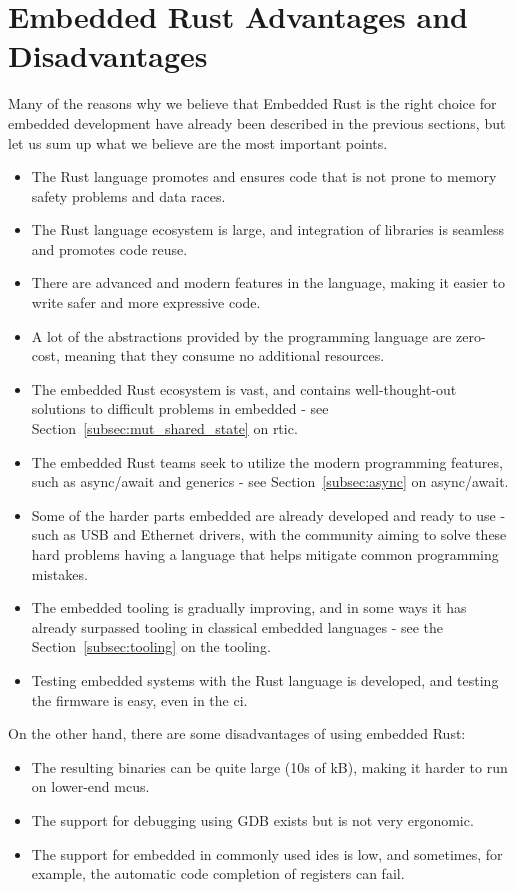 \section{Embedded Rust Advantages and Disadvantages}
\label{sec:embedded_rust_reasoning}
Many of the reasons why we believe that Embedded Rust is the right choice for embedded development have already been described in the previous sections, but let us sum up what we believe are the most important points.
\begin{itemize}
    \item The Rust language promotes and ensures code that is not prone to memory safety problems and data races.
    \item The Rust language ecosystem is large, and integration of libraries is seamless and promotes code reuse.
    \item There are advanced and modern features in the language, making it easier to write safer and more expressive code.
    \item A lot of the abstractions provided by the programming language are zero-cost, meaning that they consume no additional resources.
    \item The embedded Rust ecosystem is vast, and contains well-thought-out solutions to difficult problems in embedded - see Section~\ref{subsec:mut_shared_state} on \acs{rtic}.
    \item The embedded Rust teams seek to utilize the modern programming features, such as async/await and generics - see Section~\ref{subsec:async} on async/await.
    \item Some of the harder parts embedded are already developed and ready to use - such as USB and Ethernet drivers, with the community aiming to solve these hard problems having a language that helps mitigate common programming mistakes.
    \item The embedded tooling is gradually improving, and in some ways it has already surpassed tooling in classical embedded languages - see the Section~\ref{subsec:tooling} on the tooling.
    \item Testing embedded systems with the Rust language is developed, and testing the firmware is easy, even in the \acs{ci}.
\end{itemize}

On the other hand, there are some disadvantages of using embedded Rust:
\begin{itemize}
    \item The resulting binaries can be quite large (10s of kB), making it harder to run on lower-end \acs{mcu}s.
    \item The support for debugging using GDB exists but is not very ergonomic.
    \item The support for embedded in commonly used \acs{ide}s is low, and sometimes, for example, the automatic code completion of registers can fail.
\end{itemize}
